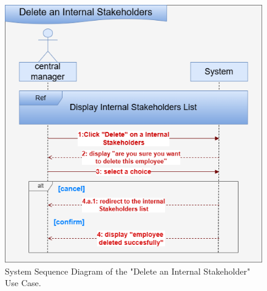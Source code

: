 \begin{figure}[h!]
    \centering
    \includegraphics[width=1\textwidth]{figures/seqdelete internal.png}
    \caption{System Sequence Diagram of the "Delete an Internal Stakeholder" Use Case.}
\end{figure}
\clearpage

